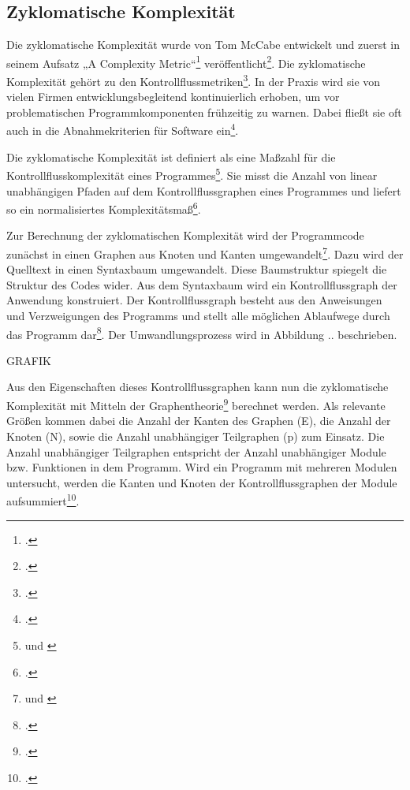 \subsection{Zyklomatische Komplexität}\label{Zyklomatische-Komplexitat}

Die zyklomatische Komplexität wurde von Tom McCabe entwickelt und zuerst
in seinem Aufsatz „A Complexity Metric``\footcite[Vgl. ][]{mccabeComplexityMeasure1976}
veröffentlicht\footcite[Vgl. ][S. 185]{sneedSoftwareZahlenVermessung2010}. Die zyklomatische
Komplexität gehört zu den Kontrollflussmetriken\footcite[Vgl. ][S. 88]{ebertSoftwareMetrikenPraxisEinfuhrung1996}. In der Praxis wird sie von vielen Firmen
entwicklungsbegleitend kontinuierlich erhoben, um vor problematischen
Programmkomponenten frühzeitig zu warnen. Dabei flie\ss t sie oft auch in
die Abnahmekriterien für Software ein\footcite[Vgl. ][S. 275]{hoffmannSoftwareQualitat2013}.

Die zyklomatische Komplexität ist definiert als eine Ma\ss zahl für die
Kontrollflusskomplexität eines Programmes\footnote{\cite[Vgl. ][S. 2]{rumreichExaminingSoftwareDesign2019} und \cite[S. 335]{jonesAppliedSoftwareMeasurement2008}}. Sie misst die Anzahl von linear
unabhängigen Pfaden auf dem Kontrollflussgraphen eines Programmes und
liefert so ein normalisiertes Komplexitätsma\ss \footcite[Vgl. ][S. 2]{rumreichExaminingSoftwareDesign2019}.

Zur Berechnung der zyklomatischen Komplexität wird der Programmcode
zunächst in einen Graphen aus Knoten und Kanten umgewandelt\footnote{\cite[Vgl. ][S. 185]{sneedSoftwareZahlenVermessung2010} und \cite[S. 335]{jonesAppliedSoftwareMeasurement2008}}. Dazu wird der Quelltext in einen
Syntaxbaum umgewandelt. Diese Baumstruktur spiegelt die Struktur des
Codes wider. Aus dem Syntaxbaum wird ein Kontrollflussgraph der
Anwendung konstruiert. Der Kontrollflussgraph besteht aus den
Anweisungen und Verzweigungen des Programms und stellt alle möglichen
Ablaufwege durch das Programm dar\footcite[Vgl. ][]{rackeKontrollflussdiagramme2017}.
Der Umwandlungsprozess wird in Abbildung .. beschrieben.

GRAFIK

Aus den Eigenschaften dieses Kontrollflussgraphen kann nun die
zyklomatische Komplexität mit Mitteln der Graphentheorie\footcite[Vgl. ][S. 273]{hoffmannSoftwareQualitat2013} berechnet werden. Als relevante Grö\ss en kommen dabei die
Anzahl der Kanten des Graphen (E), die Anzahl der Knoten (N), sowie die
Anzahl unabhängiger Teilgraphen (p) zum Einsatz. Die Anzahl unabhängiger
Teilgraphen entspricht der Anzahl unabhängiger Module bzw. Funktionen in
dem Programm. Wird ein Programm mit mehreren Modulen untersucht, werden
die Kanten und Knoten der Kontrollflussgraphen der Module
aufsummiert\footcite[Vgl. ][S. 275f]{hoffmannSoftwareQualitat2013}.

